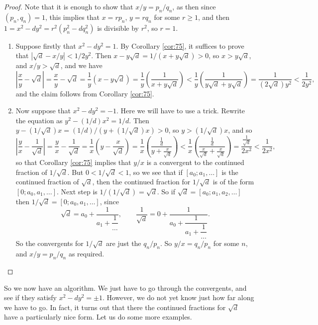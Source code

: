\documentclass{article}
\newcommand{\rb}[1]{\left( #1 \right)}
\renewcommand{\sb}[1]{\left[ #1 \right]}
\newcommand{\abs}[1]{\left\lvert #1 \right\rvert}
\theoremstyle{definition}\newtheorem{definition}{Definition}
\theoremstyle{definition}\newtheorem{remark}[definition]{Remark}
\theoremstyle{definition}\newtheorem*{example}{Example}
\theoremstyle{definition}\newtheorem*{note}{Note}
\begin{document}
\begin{proof}
Note that it is enough to show that $ x / y = p_n / q_n $, as then since $ \rb{p_n, q_n} = 1 $, this implies that $ x = rp_n $, $ y = rq_n $ for some $ r \ge 1 $, and then $ 1 = x^2 - dy^2 = r^2\rb{p_n^2 - dq_n^2} $ is divisible by $ r^2 $, so $ r = 1 $.
\begin{enumerate}
\item Suppose firstly that $ x^2 - dy^2 = 1 $. By Corollary \ref{cor:75}, it suffices to prove that $ \abs{\sqrt{d} - x / y} < 1 / 2y^2 $. Then $ x - y\sqrt{d} = 1 / \rb{x + y\sqrt{d}} > 0 $, so $ x > y\sqrt{d} $, and $ x / y > \sqrt{d} $, and we have
$$ \abs{\dfrac{x}{y} - \sqrt{d}} = \dfrac{x}{y} - \sqrt{d} = \dfrac{1}{y}\rb{x - y\sqrt{d}} = \dfrac{1}{y}\rb{\dfrac{1}{x + y\sqrt{d}}} < \dfrac{1}{y}\rb{\dfrac{1}{y\sqrt{d} + y\sqrt{d}}} = \dfrac{1}{\rb{2\sqrt{d}}y^2} < \dfrac{1}{2y^2}, $$
and the claim follows from Corollary \ref{cor:75}.
\item Now suppose that $ x^2 - dy^2 = -1 $. Here we will have to use a trick. Rewrite the equation as $ y^2 - \rb{1 / d}x^2 = 1 / d $. Then $ y - \rb{1 / \sqrt{d}}x = \rb{1 / d} / \rb{y + \rb{1 / \sqrt{d}}x} > 0 $, so $ y > \rb{1 / \sqrt{d}}x $, and so
$$ \abs{\dfrac{y}{x} - \dfrac{1}{\sqrt{d}}} = \dfrac{y}{x} - \dfrac{1}{\sqrt{d}} = \dfrac{1}{x}\rb{y - \dfrac{x}{\sqrt{d}}} = \dfrac{1}{x}\rb{\dfrac{\tfrac{1}{d}}{y + \tfrac{x}{\sqrt{d}}}} < \dfrac{1}{x}\rb{\dfrac{\tfrac{1}{d}}{\tfrac{x}{\sqrt{d}} + \tfrac{x}{\sqrt{d}}}} = \dfrac{\tfrac{1}{\sqrt{d}}}{2x^2} < \dfrac{1}{2x^2}, $$
so that Corollary \ref{cor:75} implies that $ y / x $ is a convergent to the continued fraction of $ 1 / \sqrt{d} $. But $ 0 < 1 / \sqrt{d} < 1 $, so we see that if $ \sb{a_0; a_1, \dots} $ is the continued fraction of $ \sqrt{d} $, then the continued fraction for $ 1 / \sqrt{d} $ is of the form $ \sb{0; a_0, a_1, \dots} $. Next step is $ 1 / \rb{1 / \sqrt{d}} = \sqrt{d} $. So if $ \sqrt{d} = \sb{a_0; a_1, a_2, \dots} $ then $ 1 / \sqrt{d} = \sb{0; a_0, a_1, \dots} $, since
$$ \sqrt{d} = a_0 + \dfrac{1}{a_1 + \dfrac{1}{\dots}}, \qquad \dfrac{1}{\sqrt{d}} = 0 + \dfrac{1}{a_0 + \dfrac{1}{a_1 + \dfrac{1}{\dots}}}. $$
So the convergents for $ 1 / \sqrt{d} $ are just the $ q_n / p_n $. So $ y / x = q_n / p_n $ for some $ n $, and $ x / y = p_n / q_n $ as required.
\end{enumerate}
\end{proof}

So we now have an algorithm. We just have to go through the convergents, and see if they satisfy $ x^2 - dy^2 = \pm 1 $. However, we do not yet know just how far along we have to go. In fact, it turns out that there the continued fractions for $ \sqrt{d} $ have a particularly nice form. Let us do some more examples.
\end{document}
